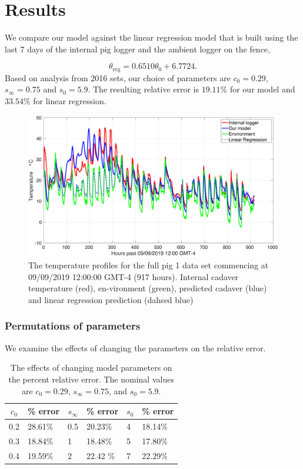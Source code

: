 \documentclass{beamer}
\begin{document}
\section{Results}
\begin{frame}
We compare our model against the linear regression model that is built
using the last 7 days of the internal pig logger and the ambient
logger on the fence,

\begin{equation}
\label{eq:2019-lr}
    \theta_{\text{reg}} = 0.6510 \theta_0 + 6.7724.
  \end{equation}
  Based on analysis from 2016 sets, our choice of parameters are $c_0
  = 0.29$, $s_\infty = 0.75$ and $s_0 = 5.9$. The resulting relative
  error is $19.11\%$ for our model and $33.54\%$ for linear regression.  
\end{frame}

\begin{frame}
  \begin{figure}
    \includegraphics[width=\textwidth]{Figures/full-pred}
    \caption{The temperature profiles for the full pig 1 data set
      commencing at 09/09/2019 12:00:00 GMT-4 (917 hours). Internal
      cadaver temperature (red), en-vironment (green), predicted
      cadaver (blue) and linear regression prediction (dahsed blue)}
  \end{figure}
\end{frame}

\begin{frame}
\frametitle{Permutations of parameters}
We examine the effects of changing the parameters on the relative
error.
\begin{table}
\centering
\caption{The effects of changing model parameters on 
the percent relative error.  The nominal values are $c_0=0.29$,
$s_\infty=0.75$, and $s_0=5.9$.}
\vspace{2mm}
\label{tab:param-invest}
\begin{tabular}{ll|ll|ll}
\multicolumn{1}{c}{$c_0$} & \% error &
\multicolumn{1}{c}{$s_\infty$} & \% error &
\multicolumn{1}{c}{$s_0$} & \% error \\
\hline\hline 0.2 & 28.61\% & 0.5 & 20.23\% & 4 & 18.14\% \\
0.3 & 18.84\% & 1 & 18.48\% & 5 & 17.80\% \\
0.4 & 19.59\% & 2 & 22.42 \% & 7 & 22.29\%
\end{tabular}
\end{table}
\end{frame}
\end{document}
